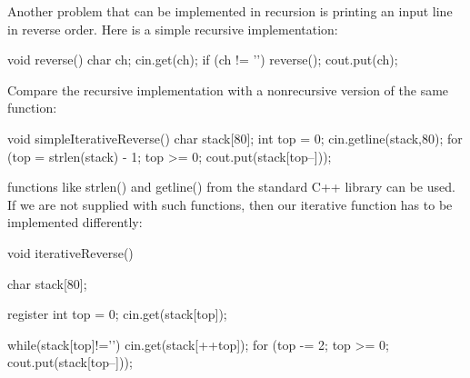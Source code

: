 \documentclass{report}
\begin{document}
    \bigbreak \noindent 
    Another problem that can be implemented in recursion is printing an input line in reverse order. Here is a simple recursive implementation:
    \bigbreak \noindent 
    \begin{cppcode}
        void reverse() {
            char ch;
            cin.get(ch);
            if (ch != '\n') {
                reverse();
                cout.put(ch); 
            }
        }
    \end{cppcode}
    \bigbreak \noindent 
    Compare the recursive implementation with a nonrecursive version of the same function:
    \bigbreak \noindent 
    \begin{cppcode}
        void simpleIterativeReverse() {
            char stack[80];
            int top = 0;
            cin.getline(stack,80);
            for (top = strlen(stack) - 1; top >= 0; cout.put(stack[top--]));
        }
    \end{cppcode}
    \bigbreak \noindent 
    functions like strlen() and
    getline() from the standard C++ library can be used. If we are not supplied with
    such functions, then our iterative function has to be implemented differently:
    \bigbreak \noindent 
    \begin{cppcode}
        void iterativeReverse() {
            char stack[80];

            register int top = 0;
            cin.get(stack[top]);

            while(stack[top]!='\n') {
                cin.get(stack[++top]);
            }
            for (top -= 2; top >= 0; cout.put(stack[top--]));
        }
    \end{cppcode}

    \pagebreak 
\end{document}
